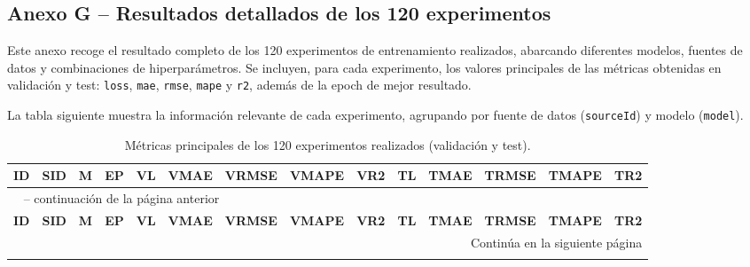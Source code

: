 \begin{landscape}
\section*{Anexo G – Resultados detallados de los 120 experimentos}
\label{anexo:resultados_exp}

Este anexo recoge el resultado completo de los 120 experimentos de entrenamiento realizados, abarcando diferentes modelos, fuentes de datos y combinaciones de hiperparámetros. Se incluyen, para cada experimento, los valores principales de las métricas obtenidas en validación y test: \texttt{loss}, \texttt{mae}, \texttt{rmse}, \texttt{mape} y \texttt{r2}, además de la epoch de mejor resultado. 

La tabla siguiente muestra la información relevante de cada experimento, agrupando por fuente de datos (\texttt{sourceId}) y modelo (\texttt{model}).

\scriptsize
\setlength{\extrarowheight}{0.5pt}
\begin{longtable}{c | c | c | c | c | c | c | c | c | c | c | c | c | c}
	\caption{Métricas principales de los 120 experimentos realizados (validación y test).} \\
	\toprule
	\textbf{ID} & \textbf{SID} & \textbf{M} & \textbf{EP} & \textbf{VL} & \textbf{VMAE} & \textbf{VRMSE} & \textbf{VMAPE} & \textbf{VR2} & \textbf{TL} & \textbf{TMAE} & \textbf{TRMSE} & \textbf{TMAPE} & \textbf{TR2} \\
	\midrule
	\endfirsthead
	
	\multicolumn{14}{l}{\tablename\ \thetable{} -- continuación de la página anterior} \\
	\toprule
	\textbf{ID} & \textbf{SID} & \textbf{M} & \textbf{EP} & \textbf{VL} & \textbf{VMAE} & \textbf{VRMSE} & \textbf{VMAPE} & \textbf{VR2} & \textbf{TL} & \textbf{TMAE} & \textbf{TRMSE} & \textbf{TMAPE} & \textbf{TR2} \\
	\midrule
	\endhead
	
	\bottomrule
	\multicolumn{14}{r}{Continúa en la siguiente página} \\
	\endfoot
	

\end{longtable}
\end{landscape}
